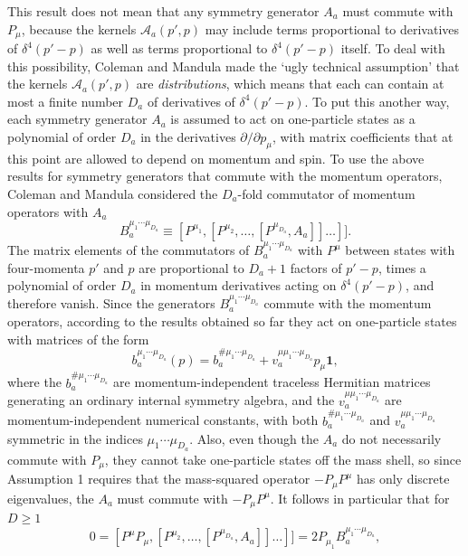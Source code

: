 This result does not mean that any symmetry generator $A_a$ must commute
with $P_\mu$, because the kernels $\mathcal{A}_a(p',p)$ may include terms
proportional to derivatives of $\delta^4(p'-p)$ as well as terms proportional
to $\delta^4(p'-p)$ itself. To deal with this possibility, Coleman and Mandula
made the `ugly technical assumption' that the kernels
$\mathcal{A}_a(p',p)$ are \emph{distributions}, which means that each can
contain at most a finite number $D_a$ of derivatives of
$\delta^4(p'-p)$. To put this another way, each symmetry generator $A_a$
is assumed to act on one-particle states as a polynomial of order $D_a$
in the derivatives $\partial/\partial p_\mu$, with matrix coefficients that at
this point are allowed to depend on momentum and spin. To use the above
results for symmetry generators that commute with the momentum operators,
Coleman and Mandula considered the $D_a$-fold commutator of momentum
operators with $A_a$
\begin{equation}
 B_a^{\mu_1\cdots\mu_{D_a}}
 \equiv
 [P^{\mu_1},[P^{\mu_2},\ldots,
 [P^{\mu_{D_a}},A_a]]\ldots]].
\tag{24.B.26}\label{eq:24.B.26}
\end{equation}
The matrix elements of the commutators of
$B_a^{\mu_1\cdots\mu_{D_a}}$ with $P^\mu$ between states with
four-momenta $p'$ and $p$ are proportional to $D_a+1$ factors of $p'-p$,
times a polynomial of order $D_a$ in momentum derivatives acting on
$\delta^4(p'-p)$, and therefore vanish. Since the generators
$B_a^{\mu_1\cdots\mu_{D_a}}$ commute with the momentum operators,
according to the results obtained so far they act on one-particle states with
matrices of the form
\begin{equation}
 b_a^{\mu_1\cdots\mu_{D_a}}(p)
 =b_a^{\#\mu_1\cdots\mu_{D_a}}
 +v_a^{\mu\mu_1\cdots\mu_{D_a}}p_\mu\mathbf{1},
\tag{24.B.27}\label{eq:24.B.27}
\end{equation}
where the $b_a^{\#\mu_1\cdots\mu_{D_a}}$ are
momentum-independent traceless Hermitian matrices generating an ordinary
internal symmetry algebra, and the
$v_a^{\mu\mu_1\cdots\mu_{D_a}}$ are momentum-independent numerical
constants, with both $b_a^{\#\mu_1\cdots\mu_{D_a}}$ and
$v_a^{\mu\mu_1\cdots\mu_{D_a}}$ symmetric in the indices
$\mu_1\cdots\mu_{D_a}$. Also, even though the $A_a$ do not
necessarily commute with $P_\mu$, they cannot take one-particle states off the
mass shell, so since Assumption 1 requires that the mass-squared operator
$-P_\mu P^\mu$ has only discrete eigenvalues, the $A_a$ must commute with
$-P_\mu P^\mu$. It follows in particular that for $D\geq1$
\[
 0=[P^\mu P_\mu,[P^{\mu_2},\ldots,
 [P^{\mu_{D_a}},A_a]]\ldots]]
 =2P_{\mu_1}B_a^{\mu_1\cdots\mu_{D_a}},
\]

